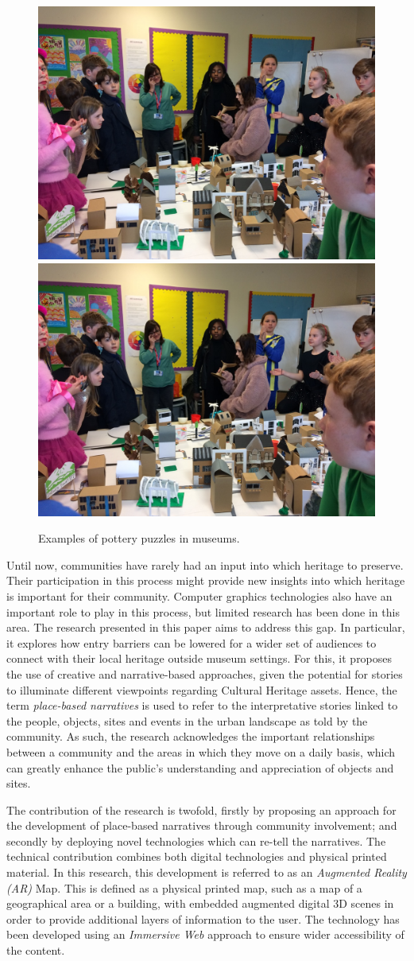 \documentclass[acmlarge,screen,dvipsnames]{acmart}
\begin{document}
\begin{figure}[b]
  \centering
  {\includegraphics[width=0.35\linewidth]{images/IMG_7377}}
  \hspace{0.5in}
  {\includegraphics[width=0.35\linewidth]{images/IMG_7377}}
  \caption{\label{fig:puz}Examples of pottery puzzles in museums.}
\end{figure}

Until now, communities have rarely had an input into which heritage to preserve.
Their participation in this process might provide new insights into which
heritage is important for their community. Computer graphics technologies also
have an important role to play in this process, but limited research has
been done in this area. The research presented in this paper aims to address
this gap. In particular, it explores how entry barriers can be lowered for a
wider set of audiences to connect with their local heritage outside museum
settings. For this, it proposes the use of creative and narrative-based
approaches, given the potential for stories to illuminate different viewpoints
regarding Cultural Heritage assets. Hence, the term \textit{place-based
narratives} is used to refer to the interpretative stories linked to the
people, objects, sites and events in the urban landscape as told by the
community. As such, the research acknowledges the important relationships
between a community and the areas in which they move on a daily basis, which
can greatly enhance the public's understanding and appreciation of objects and
sites. 

The contribution of the research is twofold, firstly by proposing an approach for
the development of place-based narratives through community involvement; and
secondly by deploying novel technologies which can re-tell the
narratives. The technical contribution combines both digital technologies and
physical printed material. In this research, this development is referred to
as an \emph{Augmented Reality (AR)} Map. This is defined as a physical printed
map, such as a map of a geographical area or a building, with embedded
augmented digital 3D scenes in order to provide additional layers of
information to the user. The technology has been developed using an
\emph{Immersive Web} approach to ensure wider accessibility of the content.
\end{document}

